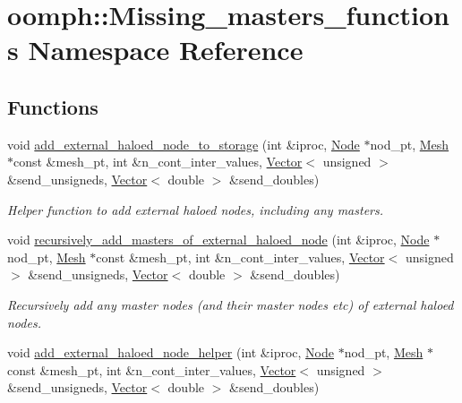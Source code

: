 \hypertarget{namespaceoomph_1_1Missing__masters__functions}{}\section{oomph\+:\+:Missing\+\_\+masters\+\_\+functions Namespace Reference}
\label{namespaceoomph_1_1Missing__masters__functions}
\subsection*{Functions}
\begin{DoxyCompactItemize}
\item 
void \hyperlink{namespaceoomph_1_1Missing__masters__functions_a94805dfb28ba45ff7f4d7a0d6fef108d}{add\+\_\+external\+\_\+haloed\+\_\+node\+\_\+to\+\_\+storage} (int \&iproc, \hyperlink{classoomph_1_1Node}{Node} $\ast$nod\+\_\+pt, \hyperlink{classoomph_1_1Mesh}{Mesh} $\ast$const \&mesh\+\_\+pt, int \&n\+\_\+cont\+\_\+inter\+\_\+values, \hyperlink{classoomph_1_1Vector}{Vector}$<$ unsigned $>$ \&send\+\_\+unsigneds, \hyperlink{classoomph_1_1Vector}{Vector}$<$ double $>$ \&send\+\_\+doubles)
\begin{DoxyCompactList}\small\item\em Helper function to add external haloed nodes, including any masters. \end{DoxyCompactList}\item 
void \hyperlink{namespaceoomph_1_1Missing__masters__functions_a954b632d3a93388358723d33bca9c549}{recursively\+\_\+add\+\_\+masters\+\_\+of\+\_\+external\+\_\+haloed\+\_\+node} (int \&iproc, \hyperlink{classoomph_1_1Node}{Node} $\ast$nod\+\_\+pt, \hyperlink{classoomph_1_1Mesh}{Mesh} $\ast$const \&mesh\+\_\+pt, int \&n\+\_\+cont\+\_\+inter\+\_\+values, \hyperlink{classoomph_1_1Vector}{Vector}$<$ unsigned $>$ \&send\+\_\+unsigneds, \hyperlink{classoomph_1_1Vector}{Vector}$<$ double $>$ \&send\+\_\+doubles)
\begin{DoxyCompactList}\small\item\em Recursively add any master nodes (and their master nodes etc) of external haloed nodes. \end{DoxyCompactList}\item 
void \hyperlink{namespaceoomph_1_1Missing__masters__functions_a6034e2c1c81a56272efd35886b2a9543}{add\+\_\+external\+\_\+haloed\+\_\+node\+\_\+helper} (int \&iproc, \hyperlink{classoomph_1_1Node}{Node} $\ast$nod\+\_\+pt, \hyperlink{classoomph_1_1Mesh}{Mesh} $\ast$const \&mesh\+\_\+pt, int \&n\+\_\+cont\+\_\+inter\+\_\+values, \hyperlink{classoomph_1_1Vector}{Vector}$<$ unsigned $>$ \&send\+\_\+unsigneds, \hyperlink{classoomph_1_1Vector}{Vector}$<$ double $>$ \&send\+\_\+doubles)

\end{DoxyCompactItemize}
